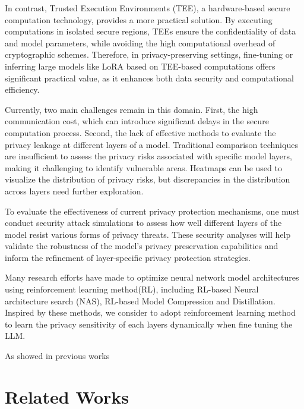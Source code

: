 \documentclass{article}
\begin{document}
In contrast, Trusted Execution Environments (TEE), a hardware-based secure computation technology, provides a more practical solution. By executing computations in isolated secure regions, TEEs ensure the confidentiality of data and model parameters, while avoiding the high computational overhead of cryptographic schemes. Therefore, in privacy-preserving settings, fine-tuning or inferring large models like LoRA based on TEE-based computations offers significant practical value, as it enhances both data security and computational efficiency.

Currently, two main challenges remain in this domain. First, the high communication cost, which can introduce significant delays in the secure computation process. Second, the lack of effective methods to evaluate the privacy leakage at different layers of a model. Traditional comparison techniques are insufficient to assess the privacy risks associated with specific model layers, making it challenging to identify vulnerable areas. Heatmaps can be used to visualize the distribution of privacy risks, but discrepancies in the distribution across layers need further exploration.

To evaluate the effectiveness of current privacy protection mechanisms, one must conduct security attack simulations to assess how well different layers of the model resist various forms of privacy threats. These security analyses will help validate the robustness of the model's privacy preservation capabilities and inform the refinement of layer-specific privacy protection strategies.


Many research efforts have made to optimize neural network model architectures using reinforcement learning method(RL), including RL-based Neural architecture search (NAS)\cite{yu2022topology,miao2022}, RL-based Model Compression and Distillation\cite{yao2024layer,yao2024scaleot}. Inspired by these methods, we consider to adopt reinforcement learning method to learn the privacy sensitivity of each layers dynamically when fine tuning the LLM. 

As showed in previous works\cite{}


\section{Related Works}
\label{related_works}
\end{document}
